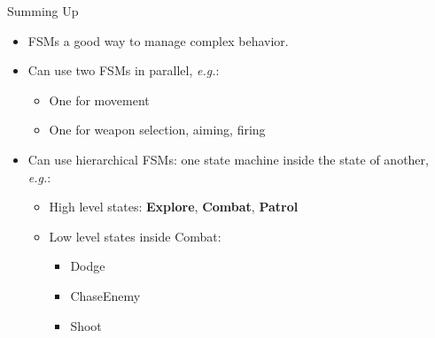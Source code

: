 \documentclass[handout,t,compress]{beamer}
\newcommand{\bi}{\begin{itemize}}
\newcommand{\li}{\item}
\newcommand{\ei}{\end{itemize}}
\newcommand{\sect}[1]{\begin{frame}[fragile]{#1}}
\begin{document}
\sect{Summing Up}

\bi
\li FSMs a good way to manage complex behavior.
\li Can use two FSMs in parallel, {\em e.g.}:
  \bi
  \li One for movement
  \li One for weapon selection, aiming, firing
  \ei
\li Can use hierarchical FSMs:
 one state machine inside the state of another, {\em e.g.}:
  \bi
  \li High level states:  {\bf Explore}, {\bf Combat}, {\bf Patrol}
  \li Low level states inside Combat:
  \bi \li Dodge \li ChaseEnemy \li Shoot \ei
  \ei
\ei

\end{frame}
\end{document}
